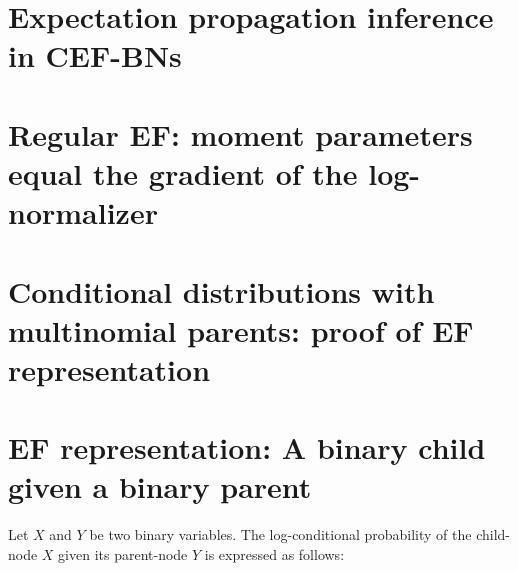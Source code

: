 \documentclass[11pt, oneside]{article}   	%
\numberwithin{figure}{section}
\numberwithin{equation}{section}
\numberwithin{table}{section}
\theoremstyle{definition}
\begin{document}
\section{Expectation propagation inference in CEF-BNs}


\begin{appendices}



\section{Regular EF: moment parameters equal the gradient of the log-normalizer}\label{appendix:regularEFequality}


\section{Conditional distributions with multinomial parents: proof of EF representation}\label{appendix:CD_With_MParents:Representation}

\section{EF representation: A binary child given a binary parent}

Let $X$ and $Y$ be two binary variables. The log-conditional probability of the child-node $X$ given its parent-node $Y$ is expressed as follows:


\end{appendices}
\end{document}
